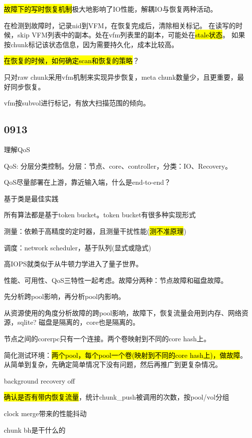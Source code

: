 \hl{故障下的写时恢复机制}极大地影响了IO性能，解耦IO与恢复两种活动。

在检测到故障时，记录nid到VFM，在恢复完成后，清除相关标记。
在读写的时候，skip VFM列表中的副本。处在vfm列表里的副本，可能处在\hl{stale状态}。
如果按chunk标记该状态信息，因为需要持久化，成本比较高。

\hl{在恢复的时候，如何确定scan和恢复的策略}？

只对raw chunk采用vfm机制来实现异步恢复，meta chunk数量少，且更重要，最好同步恢复。

vfm按subvol进行标记，有放大扫描范围的倾向。

\subsection{0913}

理解QoS
\begin{enumbox}
\item QoS: 分层分类控制。分层：节点、core、controller，分类：IO、Recovery。
\item QoS尽量部署在上游，靠近输入端，什么是end-to-end？
\item 基于类是最佳实践
\item 所有算法都是基于token bucket。token bucket有很多种实现形式
\item 测量：依赖于高精度的定时器，且测量干扰性能(\hl{测不准原理})
\item 调度：network scheduler，基于队列(显式或隐式)
\end{enumbox}

高IOPS就类似于从牛顿力学进入了量子世界。

性能、可用性、QoS三特性一起考虑。故障分两种：节点故障和磁盘故障。

先分析跨pool影响，再分析pool内影响。

从资源使用的角度分析故障的跨pool影响，故障下，恢复流量会用到内存、网络资源，sqlite?
磁盘是隔离的，core也是隔离的。

节点之间的corerpc只有一个连接。两个卷映射到不同的core hash上。

简化测试环境：\hl{两个pool，每个pool一个卷(映射到不同的core hash上)，做故障}。
从简单到复杂，先确定简单情况下没有问题，然后再推广到更复杂情况。

\begin{enumbox}
\item background recovery off
\item \hl{确认是否有带内恢复流量}，统计chunk\_push被调用的次数，按pool/vol分组
\item clock merge带来的性能抖动
\item chunk bh是干什么的
\end{enumbox}

